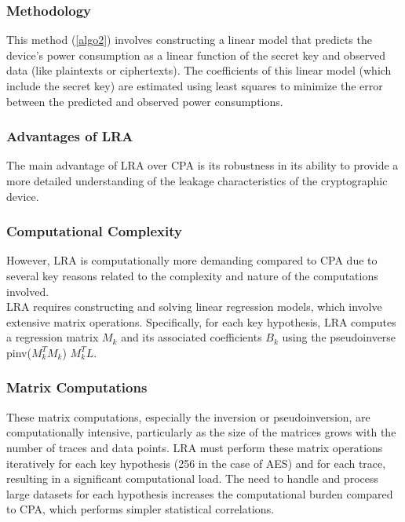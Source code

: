 \documentclass[a4paper,10pt]{article}
\begin{document}
\subsubsection{Methodology}
This method (\ref{algo2}) involves constructing a linear model that predicts the device's power consumption as a linear function of the secret key and observed data (like plaintexts or ciphertexts). The coefficients of this linear model (which include the secret key) are estimated using least squares to minimize the error between the predicted and observed power consumptions.

\subsubsection{Advantages of LRA}
The main advantage of LRA over CPA is its robustness in its ability to provide a more detailed understanding of the leakage characteristics of the cryptographic device.

\subsubsection{Computational Complexity}
However, LRA is computationally more demanding compared to CPA due to several key reasons related to the complexity and nature of the computations involved.\\
LRA requires constructing and solving linear regression models, which involve extensive matrix operations. 
Specifically, for each key hypothesis, LRA computes a regression matrix  $M_k$ and its associated coefficients $B_k$ using the pseudoinverse pinv($M_k^T M_k$) $M_k^T L$.

\subsubsection{Matrix Computations}
These matrix computations, especially the inversion or pseudoinversion, are computationally intensive, particularly as the size of the matrices grows with the number of traces and data points.  
LRA must perform these matrix operations iteratively for each key hypothesis (256 in the case of AES) and for each trace, resulting in a significant computational load. The need to handle and process large datasets for each hypothesis increases the computational burden compared to CPA, which performs simpler statistical correlations.
\end{document}
